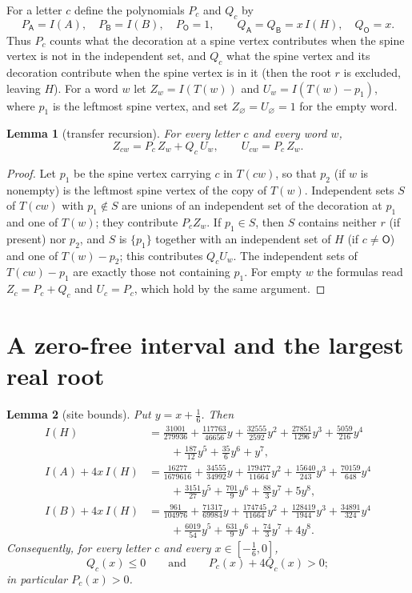 \documentclass[11pt]{article}
\newtheorem{lemma}{Lemma}
\theoremstyle{definition}
\theoremstyle{remark}
\newcommand{\sA}{\mathsf A}
\newcommand{\sB}{\mathsf B}
\newcommand{\sO}{\mathsf O}
\begin{document}
For a letter $c$ define the polynomials $P_c$ and $Q_c$ by
\[
P_\sA=I(A),\quad P_\sB=I(B),\quad P_\sO=1,\qquad
Q_\sA=Q_\sB=x\,I(H),\quad Q_\sO=x .
\]
Thus $P_c$ counts what the decoration at a spine vertex contributes when the
spine vertex is not in the independent set, and $Q_c$ what the spine vertex and
its decoration contribute when the spine vertex is in it (then the root $r$ is
excluded, leaving $H$). For a word $w$ let $Z_w=I(T(w))$ and
$U_w=I(T(w)-p_1)$, where $p_1$ is the leftmost spine vertex, and set
$Z_\varnothing=U_\varnothing=1$ for the empty word.

\begin{lemma}[transfer recursion]\label{lem:transfer}
For every letter $c$ and every word $w$,
\[
Z_{cw}=P_c\,Z_w+Q_c\,U_w,\qquad U_{cw}=P_c\,Z_w .
\]
\end{lemma}

\begin{proof}
Let $p_1$ be the spine vertex carrying $c$ in $T(cw)$, so that $p_2$ (if $w$
is nonempty) is the leftmost spine vertex of the copy of $T(w)$. Independent
sets $S$ of $T(cw)$ with $p_1\notin S$ are unions of an independent set of
the decoration at $p_1$ and one of $T(w)$; they contribute $P_cZ_w$. If
$p_1\in S$, then $S$ contains neither $r$ (if present) nor $p_2$, and $S$ is
$\{p_1\}$ together with an independent set of $H$ (if $c\ne\sO$) and one of
$T(w)-p_2$; this contributes $Q_cU_w$. The independent sets of $T(cw)-p_1$ are
exactly those not containing $p_1$. For empty $w$ the formulas read
$Z_c=P_c+Q_c$ and $U_c=P_c$, which hold by the same argument.
\end{proof}

\section{A zero-free interval and the largest real root}\label{sec:roots}

\begin{lemma}[site bounds]\label{lem:cert}
Put $y=x+\frac16$. Then
\begin{align*}
I(H)&=\tfrac{31001}{279936}+\tfrac{117763}{46656}y+\tfrac{32555}{2592}y^2
+\tfrac{27851}{1296}y^3+\tfrac{5059}{216}y^4\\
&\qquad+\tfrac{187}{12}y^5+\tfrac{35}{6}y^6+y^7,\\
I(A)+4x\,I(H)&=\tfrac{16277}{1679616}+\tfrac{34555}{34992}y+\tfrac{179477}{11664}y^2
+\tfrac{15640}{243}y^3+\tfrac{70159}{648}y^4\\
&\qquad+\tfrac{3151}{27}y^5+\tfrac{701}{9}y^6+\tfrac{88}{3}y^7+5y^8,\\
I(B)+4x\,I(H)&=\tfrac{961}{104976}+\tfrac{71317}{69984}y+\tfrac{174745}{11664}y^2
+\tfrac{128419}{1944}y^3+\tfrac{34891}{324}y^4\\
&\qquad+\tfrac{6019}{54}y^5+\tfrac{631}{9}y^6+\tfrac{74}{3}y^7+4y^8 .
\end{align*}
Consequently, for every letter $c$ and every $x\in[-\frac16,0]$,
\[
Q_c(x)\le 0\qquad\text{and}\qquad P_c(x)+4Q_c(x)>0 ;
\]
in particular $P_c(x)>0$.
\end{lemma}
\end{document}
